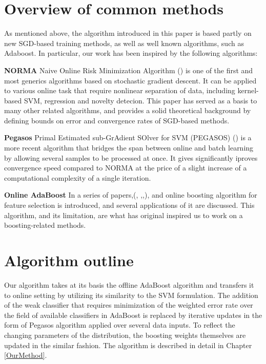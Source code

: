 \section{Overview of common methods} %
As mentioned above, the algorithm introduced in this paper is based partly on new SGD-based training methods, as well as well known algorithms, such as Adaboost. In particular, our work has been inspired by the following algorithms:

{\bf NORMA} Naive Online Risk Minimization Algorithm (\cite{Norma}) is one of the first and most generics algorithms based on stochastic gradient descent. It can be applied to various online task that require nonlinear separation of data, including kernel-based SVM, regression and novelty detecion. This paper has served as a basis to many other related algorithms, and provides a solid theoretical background by defining bounds on error and convergence rates of SGD-based methods.

{\bf Pegasos} Primal Estimated sub-GrAdient SOlver for SVM (PEGASOS) (\cite{Pegasos}) is a more recent algorithm that bridges the span between online and batch learning by allowing several samples to be processed at once. It gives significantly iproves convergence speed compared to NORMA at the price of a slight increase of a computational complexity of a single iteration. 

{\bf Online AdaBoost} In a series of papers,(\cite{grabner2006}, \cite{OnlineBoost},\cite{grabner2008},\cite{grabner2009}), and online boosting algorithm for feature selection is introduced, and several applications of it are discussed. This algorithm, and its limitation, are what has original inspired us to work on a boosting-related methods.


\section{Algorithm outline}

Our algorithm takes at its basis the offline AdaBoost algorithm and transfers it to online setting by utilizing its similarity to the SVM formulation. The addition of the weak classifier that requires minimization of the weighted error rate over the field of available classifiers in AdaBoost is replaced by iterative updates in the form of Pegasos algorithm applied over several data inputs. To reflect the changing parameters of the distribution, the boosting weights themselves are updated in the similar fashion.  The algorithm is described in detail in Chapter \ref{OurMethod}. 
